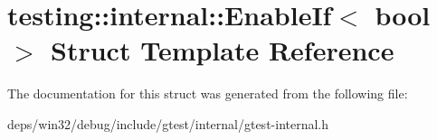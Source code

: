 \hypertarget{structtesting_1_1internal_1_1_enable_if}{}\section{testing\+:\+:internal\+:\+:Enable\+If$<$ bool $>$ Struct Template Reference}
\label{structtesting_1_1internal_1_1_enable_if}


The documentation for this struct was generated from the following file\+:\begin{DoxyCompactItemize}
\item 
deps/win32/debug/include/gtest/internal/gtest-\/internal.\+h\end{DoxyCompactItemize}
